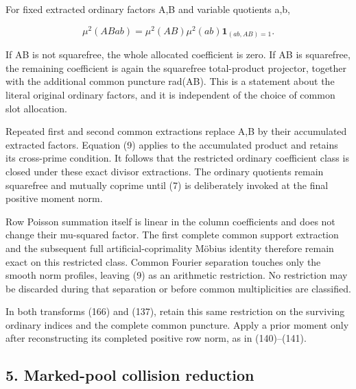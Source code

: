 For fixed extracted ordinary factors A,B and variable quotients a,b,

\[
 \mu^2(ABab)
 =\mu^2(AB)\mu^2(ab)\mathbf1_{(ab,AB)=1}.       \tag{9}
\]

If AB is not squarefree, the whole allocated coefficient is zero. If AB is squarefree, the remaining coefficient is again the squarefree total-product projector, together with the additional common puncture rad(AB). This is a statement about the literal original ordinary factors, and it is independent of the choice of common slot allocation.

Repeated first and second common extractions replace A,B by their accumulated extracted factors. Equation (9) applies to the accumulated product and retains its cross-prime condition. It follows that the restricted ordinary coefficient class is closed under these exact divisor extractions. The ordinary quotients remain squarefree and mutually coprime until (7) is deliberately invoked at the final positive moment norm.

Row Poisson summation itself is linear in the column coefficients and does not change their mu-squared factor. The first complete common support extraction and the subsequent full artificial-coprimality Möbius identity therefore remain exact on this restricted class. Common Fourier separation touches only the smooth norm profiles, leaving (9) as an arithmetic restriction. No restriction may be discarded during that separation or before common multiplicities are classified.

In both transforms (166) and (137), retain this same restriction on the surviving ordinary indices and the complete common puncture. Apply a prior moment only after reconstructing its completed positive row norm, as in (140)--(141).

\hypertarget{sources:marked-pool-collision-reduction}{%
\subsection{5. Marked-pool collision reduction}\label{sources:marked-pool-collision-reduction}}

